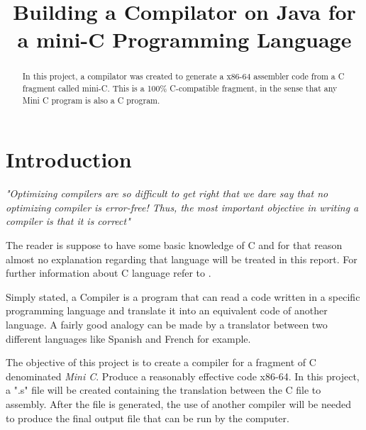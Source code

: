 \documentclass[conference]{IEEEtran}
\begin{document}
\title{Building a Compilator on Java for a mini-C Programming Language}

\author{
\and
{}
}
\maketitle

\tableofcontents
\newpage

\begin{abstract}
In this project, a compilator was created to generate a x86-64 assembler code from a C fragment called mini-C.
This is a 100\% C-compatible fragment, in the sense that any Mini C program is also a C program. 
\end{abstract}

\IEEEpeerreviewmaketitle

\section{Introduction}
\textit{"Optimizing compilers are so difficult to get right that we dare say that no optimizing compiler is error-free! Thus, the most important objective in writing a compiler is that it is correct"}\cite{DRAGON_BOOK}

The reader is suppose to have some basic knowledge of C and for that reason almost no explanation regarding that language will be treated in this report. For further information about C language refer to \cite{LANGUAGE_C}.

Simply stated, a Compiler is a program that can read a code written in a specific programming language and translate it into an equivalent code of another language. A fairly good analogy can be made by a translator between two different languages like Spanish and French for example.

The objective of this project is to create a compiler for a fragment of C denominated \textit{Mini C}. Produce a reasonably effective code x86-64. In this project, a ".s" file will be created containing the translation between the C file to assembly. After the file is generated, the use of another compiler will be needed to produce the final output file that can be run by the computer. 
\end{document}
